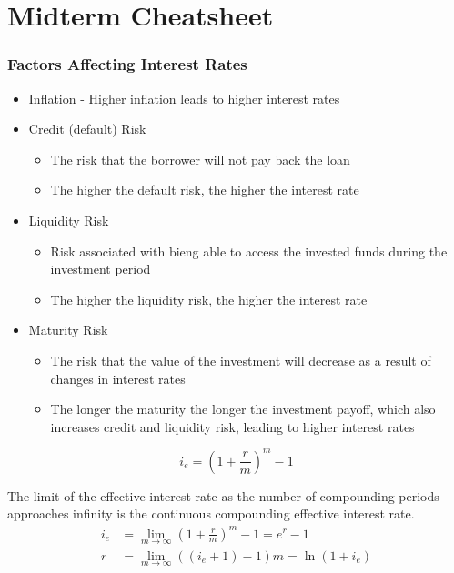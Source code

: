 \chapter{Midterm Cheatsheet}

\subsection{Factors Affecting Interest Rates}
\begin{itemize}
    \item Inflation - Higher inflation leads to higher interest rates
    \item Credit (default) Risk
          \begin{itemize}
              \item The risk that the borrower will not pay back the loan
              \item The higher the default risk, the higher the interest rate
          \end{itemize}
    \item Liquidity Risk
          \begin{itemize}
              \item Risk associated with bieng able to access the invested funds during the investment period
              \item The higher the liquidity risk, the higher the interest rate
          \end{itemize}
    \item Maturity Risk
          \begin{itemize}
              \item The risk that the value of the investment will decrease as a result of changes in interest rates
              \item The longer the maturity the longer the investment payoff, which also increases credit and liquidity risk, leading to higher interest rates
          \end{itemize}
\end{itemize}

\begin{claim}
    \begin{equation}
        i_e = (1 + \frac{r}{m})^m -1
    \end{equation}
\end{claim}


\begin{corollary}
    The limit of the effective interest rate as the number of compounding periods approaches infinity is the continuous compounding effective interest rate.
    \begin{align}
        i_e & = \lim_{m \to \infty} (1 + \frac{r}{m})^m - 1 = e^r - 1 \\
        r   & = \lim_{m \to \infty} ((i_e + 1) - 1)m = \ln(1 + i_e)
    \end{align}
\end{corollary}

